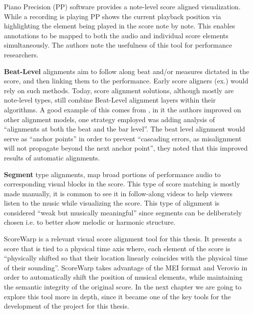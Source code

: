 Piano Precision (PP) software provides a note-level score aligned visualization. While a recording is playing PP shows the current playback position via highlighting the element being played in the score note by note. This enables annotations to be mapped to both the audio and individual score elements simultaneously. The authors note the usefulness of this tool for performance researchers. \citep{jiangPIANOPRECISIONADVANCING2025} 

\textbf{Beat-Level} alignments aim to follow along beat and/or measures dictated in the score, and then linking them to the performance. Early score aligners (ex.\citet{duanSoundprismOnlineSystem2011}) would rely on such methods. Today, score alignment solutions, although mostly are note-level types, still combine Beat-Level alignment layers within their algorithms. A good example of this comes from \citet{peterAutomaticNoteLevelScoretoPerformance2023}, in it the authors improved on other alignment models, one strategy employed was adding analysis of ``alignments at both the beat and the bar level''. The beat level alignment would serve as ``anchor points'' in order to prevent ``cascading errors, as misalignment will not propagate beyond the next anchor point'', they noted that this improved results of automatic alignments.

\textbf{Segment} type alignments, map broad portions of performance audio to corresponding visual blocks in the score. This type of score matching is mostly made manually, it is common to see it in follow-along videos to help viewers listen to the music while visualizing the score. This type of alignment is considered ``weak but musically meaningful'' \citep{jungUnifiedCrossmodalTranslation2026a} since segments can be deliberately chosen i.e. to better show melodic or harmonic structure. 


ScoreWarp is a relevant visual score alignment tool for this thesis. It presents a score that is tied to a physical time axis where, each element of the score is ``physically shifted so that their location linearly coincides with the physical time of their sounding''\citep{goeblLetsScoreWarpAgain2025a}. ScoreWarp takes advantage of the MEI format and Verovio in order to automatically shift the position of musical elements, while maintaining the semantic integrity of the original score. In the next chapter we are going to explore this tool more in depth, since it became one of the key tools for the development of the project for this thesis. 

